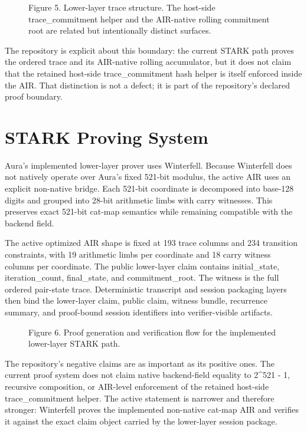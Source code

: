 \documentclass[conference]{IEEEtran}
\begin{document}
\begin{figure}[t]
\centering

\caption{Figure 5. Lower-layer trace structure. The host-side trace\_commitment helper and the AIR-native rolling commitment root are related but intentionally distinct surfaces.}
\end{figure}
The repository is explicit about this boundary: the current STARK path proves the ordered trace and its AIR-native rolling accumulator, but it does not claim that the retained host-side trace\_commitment hash helper is itself enforced inside the AIR. That distinction is not a defect; it is part of the repository's declared proof boundary.

\section{STARK Proving System}
Aura's implemented lower-layer prover uses Winterfell. Because Winterfell does not natively operate over Aura's fixed 521-bit modulus, the active AIR uses an explicit non-native bridge. Each 521-bit coordinate is decomposed into base-128 digits and grouped into 28-bit arithmetic limbs with carry witnesses. This preserves exact 521-bit cat-map semantics while remaining compatible with the backend field.

The active optimized AIR shape is fixed at 193 trace columns and 234 transition constraints, with 19 arithmetic limbs per coordinate and 18 carry witness columns per coordinate. The public lower-layer claim contains initial\_state, iteration\_count, final\_state, and commitment\_root. The witness is the full ordered pair-state trace. Deterministic transcript and session packaging layers then bind the lower-layer claim, public claim, witness bundle, recurrence summary, and proof-bound session identifiers into verifier-visible artifacts.

\begin{figure}[t]
\centering

\caption{Figure 6. Proof generation and verification flow for the implemented lower-layer STARK path.}
\end{figure}
The repository's negative claims are as important as its positive ones. The current proof system does not claim native backend-field equality to 2\textasciicircum{}521 - 1, recursive composition, or AIR-level enforcement of the retained host-side trace\_commitment helper. The active statement is narrower and therefore stronger: Winterfell proves the implemented non-native cat-map AIR and verifies it against the exact claim object carried by the lower-layer session package.
\end{document}
